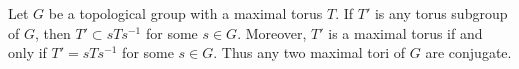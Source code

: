 Let $G$ be a topological group with a maximal torus $T$. If $T'$ is any torus subgroup of $G$, then $T' \subset sTs^{-1}$ for some $s \in G$. Moreover, $T'$ is a maximal torus if and only if $T' = sTs^{-1}$ for some $s \in G$. Thus any two maximal tori of $G$ are conjugate.
